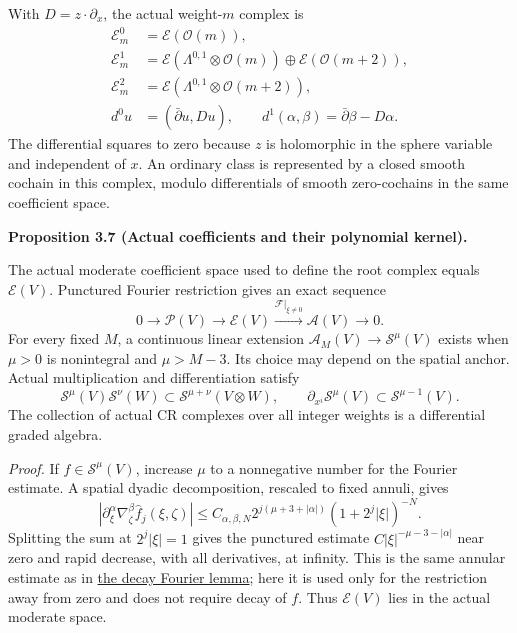 \documentclass[
  english,
  11pt,
  reqno]{amsart}
\makeatletter
\newcommand{\pandocstatementheading}[1]{%
  \par\if@nobreak\else
    \addpenalty{\@beginparpenalty}%
    \addvspace{.5\baselineskip plus .2\baselineskip minus .2\baselineskip}%
  \fi
  {\normalfont\bfseries #1\par}%
  \nobreak\@afterindenttrue\@afterheading
}
\makeatother
\begin{document}
With \(D=z\cdot\partial_x\), the actual weight-\(m\) complex is%
 \[
\begin{aligned}
\mathscr E_m^0&=\mathscr E(\mathcal O(m)),\\
\mathscr E_m^1&=\mathscr E(\Lambda^{0,1}\otimes\mathcal O(m))
 \oplus\mathscr E(\mathcal O(m+2)),\\
\mathscr E_m^2&=\mathscr E(\Lambda^{0,1}\otimes\mathcal O(m+2)),\\
d^0u&=(\bar\partial u,Du),\qquad
d^1(\alpha,\beta)=\bar\partial\beta-D\alpha.
\end{aligned}
\] The differential squares to zero because \(z\) is holomorphic in the
sphere variable and independent of \(x\). An ordinary class is
represented by a closed smooth cochain in this complex, modulo
differentials of smooth zero-cochains in the same coefficient space.

\pandocstatementheading{\leavevmode{}\label{prop:online-actual-coefficient-exact-sequence}Proposition 3.7 (Actual coefficients and their polynomial kernel).}

The actual moderate coefficient space used to define the root complex
equals \(\mathscr E(V)\). Punctured Fourier restriction gives an exact
sequence%
 \[
0\longrightarrow\mathscr P(V)
\longrightarrow\mathscr E(V)
\xrightarrow{\mathcal F|_{\xi\ne0}}\mathscr A(V)
\longrightarrow0.
\] For every fixed \(M\), a continuous linear extension
\(\mathscr A_M(V)\to\mathscr S^\mu(V)\) exists when \(\mu>0\) is
nonintegral and \(\mu>M-3\). Its choice may depend on the spatial
anchor. Actual multiplication and differentiation satisfy%
 \[
\mathscr S^\mu(V)\mathscr S^\nu(W)
\subset\mathscr S^{\mu+\nu}(V\otimes W),
\qquad
\partial_{x^i}\mathscr S^\mu(V)\subset\mathscr S^{\mu-1}(V).
\] The collection of actual CR complexes over all integer weights is a
differential graded algebra.

\emph{Proof.} If \(f\in\mathscr S^\mu(V)\), increase \(\mu\) to a
nonnegative number for the Fourier estimate. A spatial dyadic
decomposition, rescaled to fixed annuli, gives \[
\left|\partial_\xi^\alpha\nabla_\zeta^\beta\widehat f_j(\xi,\zeta)\right|
\le C_{\alpha,\beta,N}
2^{j(\mu+3+|\alpha|)}(1+2^j|\xi|)^{-N}.
\] Splitting the sum at \(2^j|\xi|=1\) gives the punctured estimate
\(C|\xi|^{-\mu-3-|\alpha|}\) near zero and rapid decrease, with all
derivatives, at infinity. This is the same annular estimate as in
\hyperref[lem:online-decay-fourier-isomorphism]{the decay Fourier
lemma}; here it is used only for the restriction away from zero and does
not require decay of \(f\). Thus \(\mathscr E(V)\) lies in the actual
moderate space.
\end{document}
